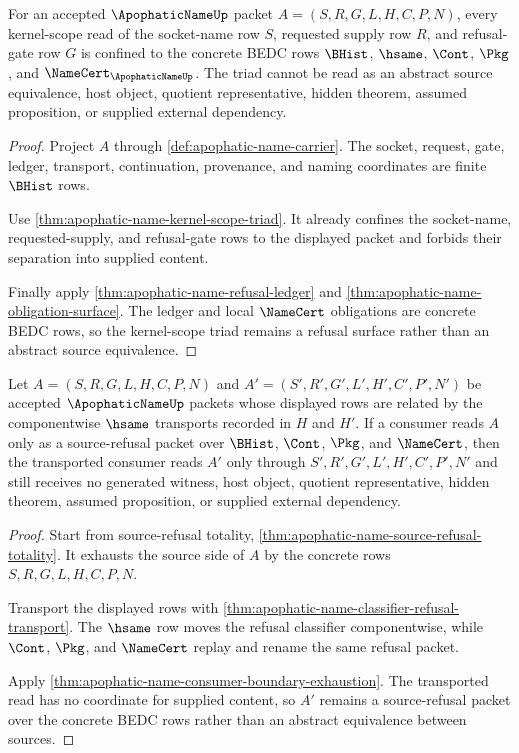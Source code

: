 \begin{theorem}
\label{thm:apophaticname-kernel-scope-refusal-triad}
For an accepted $\ApophaticNameUp$ packet $A=(S,R,G,L,H,C,P,N)$, every kernel-scope read of the socket-name row $S$, requested supply row $R$, and refusal-gate row $G$ is confined to the concrete BEDC rows $\BHist$, $\hsame$, $\Cont$, $\Pkg$, and $\NameCert_{\ApophaticNameUp}$. The triad cannot be read as an abstract source equivalence, host object, quotient representative, hidden theorem, assumed proposition, or supplied external dependency.
\end{theorem}
\begin{proof}
Project $A$ through \autoref{def:apophatic-name-carrier}. The socket, request, gate, ledger, transport, continuation, provenance, and naming coordinates are finite $\BHist$ rows.

Use \autoref{thm:apophatic-name-kernel-scope-triad}. It already confines the socket-name, requested-supply, and refusal-gate rows to the displayed packet and forbids their separation into supplied content.

Finally apply \autoref{thm:apophatic-name-refusal-ledger} and \autoref{thm:apophatic-name-obligation-surface}. The ledger and local $\NameCert$ obligations are concrete BEDC rows, so the kernel-scope triad remains a refusal surface rather than an abstract source equivalence.
\end{proof}

\begin{theorem}
\label{thm:apophaticname-source-refusal-transport}
Let $A=(S,R,G,L,H,C,P,N)$ and $A'=(S',R',G',L',H',C',P',N')$ be accepted $\ApophaticNameUp$ packets whose displayed rows are related by the componentwise $\hsame$ transports recorded in $H$ and $H'$. If a consumer reads $A$ only as a source-refusal packet over $\BHist$, $\Cont$, $\Pkg$, and $\NameCert$, then the transported consumer reads $A'$ only through $S',R',G',L',H',C',P',N'$ and still receives no generated witness, host object, quotient representative, hidden theorem, assumed proposition, or supplied external dependency.
\end{theorem}
\begin{proof}
Start from source-refusal totality, \autoref{thm:apophatic-name-source-refusal-totality}. It exhausts the source side of $A$ by the concrete rows $S,R,G,L,H,C,P,N$.

Transport the displayed rows with \autoref{thm:apophatic-name-classifier-refusal-transport}. The $\hsame$ row moves the refusal classifier componentwise, while $\Cont$, $\Pkg$, and $\NameCert$ replay and rename the same refusal packet.

Apply \autoref{thm:apophatic-name-consumer-boundary-exhaustion}. The transported read has no coordinate for supplied content, so $A'$ remains a source-refusal packet over the concrete BEDC rows rather than an abstract equivalence between sources.
\end{proof}


